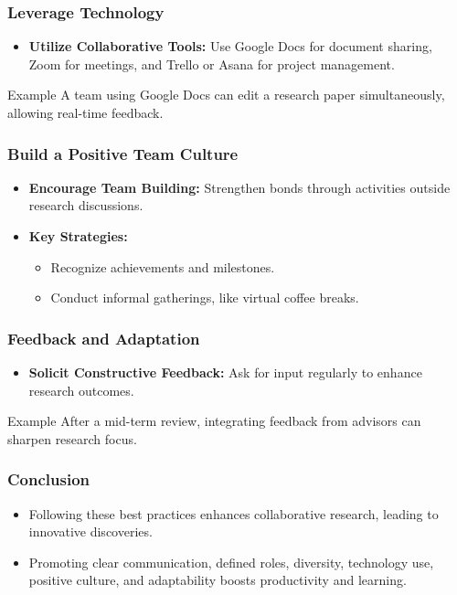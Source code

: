 \documentclass[aspectratio=169]{beamer}
\begin{document}
\begin{frame}[fragile]
    \frametitle{Leverage Technology}
    \begin{itemize}
        \item \textbf{Utilize Collaborative Tools:} Use Google Docs for document sharing, Zoom for meetings, and Trello or Asana for project management.
    \end{itemize}
    \begin{block}{Example}
        A team using Google Docs can edit a research paper simultaneously, allowing real-time feedback.
    \end{block}
\end{frame}

\begin{frame}[fragile]
    \frametitle{Build a Positive Team Culture}
    \begin{itemize}
        \item \textbf{Encourage Team Building:} Strengthen bonds through activities outside research discussions.
        \item \textbf{Key Strategies:}
        \begin{itemize}
            \item Recognize achievements and milestones.
            \item Conduct informal gatherings, like virtual coffee breaks.
        \end{itemize}
    \end{itemize}
\end{frame}

\begin{frame}[fragile]
    \frametitle{Feedback and Adaptation}
    \begin{itemize}
        \item \textbf{Solicit Constructive Feedback:} Ask for input regularly to enhance research outcomes.
    \end{itemize}
    \begin{block}{Example}
        After a mid-term review, integrating feedback from advisors can sharpen research focus.
    \end{block}
\end{frame}

\begin{frame}[fragile]
    \frametitle{Conclusion}
    \begin{itemize}
        \item Following these best practices enhances collaborative research, leading to innovative discoveries.
        \item Promoting clear communication, defined roles, diversity, technology use, positive culture, and adaptability boosts productivity and learning.
    \end{itemize}
\end{frame}
\end{document}
